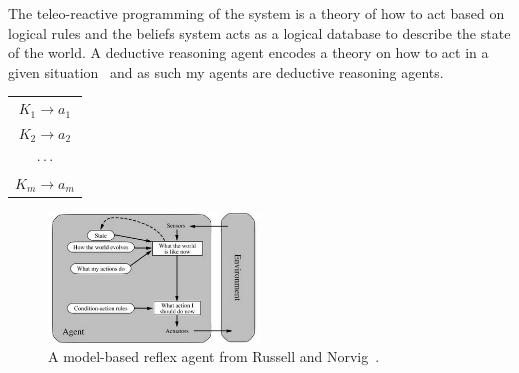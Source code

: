 \documentclass[]{final_report}
\begin{document}
The teleo-reactive programming of the system is a theory of how to act based on logical rules and the beliefs system acts as a logical database to describe the state of the world. A deductive reasoning agent encodes a theory on how to act in a given situation~\cite{kostas_deductive} and as such my agents are deductive reasoning agents.
\begin{framed}
	\begin{center}
		\begin{tabular}{c}
		$K_1 \rightarrow a_1$\\
		$K_2 \rightarrow a_2$\\
		$\cdot \cdot \cdot$\\
		$K_m \rightarrow a_m$
		\end{tabular}
		\label{tab:trrules}
	\end{center}	
\end{framed}
\begin{figure}
	\begin{center}
	\includegraphics[width=0.5\textwidth]{RuNorv.png}
	\caption{A model-based reflex agent from Russell and Norvig~\cite{russell2016artificial}.}
	\label{fig:model_reflex}
	\end{center}
\end{figure}
\end{document}
